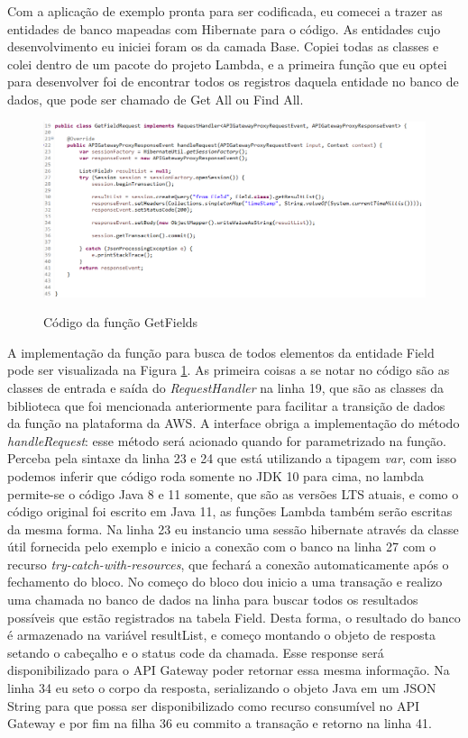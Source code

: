 Com a aplicação de exemplo pronta para ser codificada, eu comecei a trazer as entidades de banco mapeadas com Hibernate para o código. As entidades cujo desenvolvimento eu iniciei foram os da camada Base. Copiei todas as classes e colei dentro de um pacote do projeto Lambda, e a primeira função que eu optei para desenvolver foi de encontrar todos os registros daquela entidade no banco de dados, que pode ser chamado de Get All ou Find All.
\clearpage
\begin{figure}[!htb]
	\centering
	\caption{Código da função GetFields}
	\includegraphics[width=1\textwidth,height=0.4\textheight]{./dados/figuras/codigo-get-fields}
	\label{fig:codigo-get-fields}
\end{figure}

A implementação da função para busca de todos elementos da entidade Field pode ser visualizada na Figura \ref{fig:codigo-get-fields}. As primeira coisas a se notar no código são as classes de entrada e saída do \textit{RequestHandler} na linha 19, que são as classes da biblioteca que foi mencionada anteriormente para facilitar a transição de dados da função na plataforma da AWS. A interface obriga a implementação do método \textit{handleRequest}: esse método será acionado quando for parametrizado na função. Perceba pela sintaxe da linha 23 e 24 que está utilizando a tipagem \textit{var}, com isso podemos inferir que código roda somente no JDK 10 para cima, no lambda permite-se o código Java 8 e 11 somente, que são as versões LTS atuais, e como o código original foi escrito em Java 11, as funções Lambda também serão escritas da mesma forma. Na linha 23 eu instancio uma sessão hibernate através da classe útil fornecida pelo exemplo e inicio a conexão com o banco na linha 27 com o recurso \textit{try-catch-with-resources}, que fechará a conexão automaticamente após o fechamento do bloco. No começo do bloco dou inicio a uma transação e realizo uma chamada no banco de dados na linha para buscar todos os resultados possíveis que estão registrados na tabela Field. Desta forma, o resultado  do banco é armazenado na variável resultList, e começo montando o objeto de resposta setando o cabeçalho e o status code da chamada. Esse response será disponibilizado para o API Gateway poder retornar essa mesma informação. Na linha 34 eu seto o corpo da resposta, serializando o objeto Java em um JSON String para que possa ser disponibilizado como recurso consumível no API Gateway e por fim na filha 36 eu commito a transação e retorno na linha 41.

